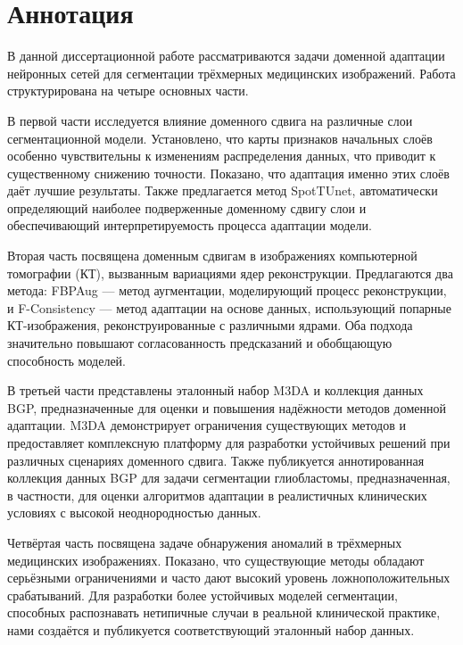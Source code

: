 \chapter*{Аннотация}

В данной диссертационной работе рассматриваются задачи доменной адаптации нейронных сетей для сегментации трёхмерных медицинских изображений. Работа структурирована на четыре основных части.

В первой части исследуется влияние доменного сдвига на различные слои сегментационной модели. Установлено, что карты признаков начальных слоёв особенно чувствительны к изменениям распределения данных, что приводит к существенному снижению точности. Показано, что адаптация именно этих слоёв даёт лучшие результаты. Также предлагается метод SpotTUnet, автоматически определяющий наиболее подверженные доменному сдвигу слои и обеспечивающий интерпретируемость процесса адаптации модели.

Вторая часть посвящена доменным сдвигам в изображениях компьютерной томографии (КТ), вызванным вариациями ядер реконструкции. Предлагаются два метода: FBPAug --- метод аугментации, моделирующий процесс реконструкции, и F-Consistency --- метод адаптации на основе данных, использующий попарные КТ-изображения, реконструированные с различными ядрами. Оба подхода значительно повышают согласованность предсказаний и обобщающую способность моделей.%

В третьей части представлены эталонный набор M3DA и коллекция данных BGP, предназначенные для оценки и повышения надёжности методов доменной адаптации. M3DA демонстрирует ограничения существующих методов и предоставляет комплексную платформу для разработки устойчивых решений при различных сценариях доменного сдвига. Также публикуется аннотированная коллекция данных BGP для задачи сегментации глиобластомы, предназначенная, в частности, для оценки алгоритмов адаптации в реалистичных клинических условиях с высокой неоднородностью данных.

Четвёртая часть посвящена задаче обнаружения аномалий в трёхмерных медицинских изображениях. Показано, что существующие методы обладают серьёзными ограничениями и часто дают высокий уровень ложноположительных срабатываний. Для разработки более устойчивых моделей сегментации, способных распознавать нетипичные случаи в реальной клинической практике, нами создаётся и публикуется соответствующий эталонный набор данных.
